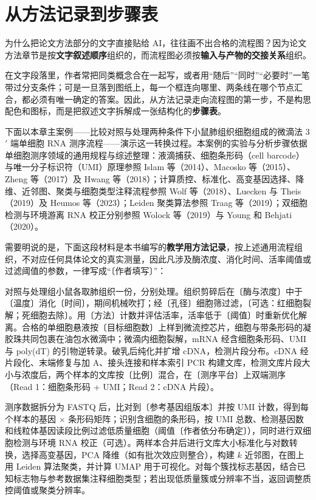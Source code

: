 \section{从方法记录到步骤表}

为什么把论文方法部分的文字直接贴给 AI，往往画不出合格的流程图？因为论文方法章节是按\textbf{文字叙述顺序}组织的，而流程图必须按\textbf{输入与产物的交接关系}组织。

在文字段落里，作者常把同类概念合在一起写，或者用“随后”“同时”“必要时”一笔带过分支条件；可是一旦落到图纸上，每一个框连向哪里、两条线在哪个节点汇合，都必须有唯一确定的答案。因此，从方法记录走向流程图的第一步，不是构思配色和图标，而是把叙述文字拆解成一张结构化的\textbf{步骤表}。

下面以本章主案例——比较对照与处理两种条件下小鼠肺组织细胞组成的微滴法 3$'$ 端单细胞 RNA 测序流程——演示这一转换过程。本案例的实验与分析步骤依据单细胞测序领域的通用规程与综述整理：液滴捕获、细胞条形码（cell barcode）与唯一分子标识符（UMI）原理参照 Islam 等（2014）、Macosko 等（2015）、Zheng 等（2017）及 Hwang 等（2018）；计算质控、标准化、高变基因选择、降维、近邻图、聚类与细胞类型注释流程参照 Wolf 等（2018）、Luecken 与 Theis（2019）及 Heumos 等（2023）；Leiden 聚类算法参照 Traag 等（2019）；双细胞检测与环境游离 RNA 校正分别参照 Wolock 等（2019）与 Young 和 Behjati（2020）。

需要明说的是，下面这段材料是本书编写的\textbf{教学用方法记录}，按上述通用流程组织，不对应任何具体论文的真实测量，因此凡涉及酶浓度、消化时间、活率阈值或过滤阈值的参数，一律写成“〔作者填写〕”：

\begin{BookNote}
对照与处理组小鼠各取肺组织一份，分别处理。组织剪碎后在〔酶与浓度〕中于〔温度〕消化〔时间〕，期间机械吹打；经〔孔径〕细胞筛过滤，〔可选：红细胞裂解；死细胞去除〕。用〔方法〕计数并评估活率，活率低于〔阈值〕时重新优化解离。合格的单细胞悬液按〔目标细胞数〕上样到微流控芯片，细胞与带条形码的凝胶珠共同包裹在油包水微滴中；微滴内细胞裂解，mRNA 经含细胞条形码、UMI 与 poly(dT) 的引物逆转录。破乳后纯化并扩增 cDNA，检测片段分布。cDNA 经片段化、末端修复与加 A、接头连接和样本索引 PCR 构建文库，检测文库片段大小与浓度后，两个样本的文库按〔比例〕混合，在〔测序平台〕上双端测序（Read 1：细胞条形码 + UMI；Read 2：cDNA 片段）。

测序数据拆分为 FASTQ 后，比对到〔参考基因组版本〕并按 UMI 计数，得到每个样本的基因 $\times$ 条形码矩阵；识别含细胞的条形码，按 UMI 总数、检测基因数和线粒体基因读段比例过滤低质量细胞（阈值〔作者依分布确定〕），同时进行双细胞检测与环境 RNA 校正（可选）。两样本合并后进行文库大小标准化与对数转换，选择高变基因，PCA 降维（如有批次效应则整合），构建 $k$ 近邻图，在图上用 Leiden 算法聚类，并计算 UMAP 用于可视化。对每个簇找标志基因，结合已知标志物与参考数据集注释细胞类型；若出现低质量簇或分辨率不当，返回调整质控阈值或聚类分辨率。
\end{BookNote}

